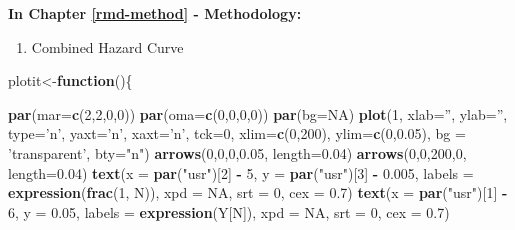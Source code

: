 \documentclass[12pt,oneside]{reedthesis}
\newenvironment{Shaded}{\begin{snugshade}}{\end{snugshade}}
\newcommand{\ControlFlowTok}[1]{\textcolor[rgb]{0.13,0.29,0.53}{\textbf{#1}}}
\newcommand{\DataTypeTok}[1]{\textcolor[rgb]{0.13,0.29,0.53}{#1}}
\newcommand{\DecValTok}[1]{\textcolor[rgb]{0.00,0.00,0.81}{#1}}
\newcommand{\FloatTok}[1]{\textcolor[rgb]{0.00,0.00,0.81}{#1}}
\newcommand{\KeywordTok}[1]{\textcolor[rgb]{0.13,0.29,0.53}{\textbf{#1}}}
\newcommand{\NormalTok}[1]{#1}
\newcommand{\OperatorTok}[1]{\textcolor[rgb]{0.81,0.36,0.00}{\textbf{#1}}}
\newcommand{\OtherTok}[1]{\textcolor[rgb]{0.56,0.35,0.01}{#1}}
\newcommand{\StringTok}[1]{\textcolor[rgb]{0.31,0.60,0.02}{#1}}
\providecommand{\tightlist}{%
  \setlength{\itemsep}{0pt}\setlength{\parskip}{0pt}}
\begin{document}
\textbf{In Chapter \ref{rmd-method} - Methodology:}
\begin{enumerate}
\def\labelenumi{\arabic{enumi}.}
\tightlist
\item
  Combined Hazard Curve
\end{enumerate}
\tiny
\begin{Shaded}
\begin{Highlighting}[]
\NormalTok{plotit<-}\ControlFlowTok{function}\NormalTok{()\{}

  \KeywordTok{par}\NormalTok{(}\DataTypeTok{mar=}\KeywordTok{c}\NormalTok{(}\DecValTok{2}\NormalTok{,}\DecValTok{2}\NormalTok{,}\DecValTok{0}\NormalTok{,}\DecValTok{0}\NormalTok{))}
  \KeywordTok{par}\NormalTok{(}\DataTypeTok{oma=}\KeywordTok{c}\NormalTok{(}\DecValTok{0}\NormalTok{,}\DecValTok{0}\NormalTok{,}\DecValTok{0}\NormalTok{,}\DecValTok{0}\NormalTok{))}
  \KeywordTok{par}\NormalTok{(}\DataTypeTok{bg=}\OtherTok{NA}\NormalTok{)}
  \KeywordTok{plot}\NormalTok{(}\DecValTok{1}\NormalTok{, }\DataTypeTok{xlab=}\StringTok{''}\NormalTok{, }\DataTypeTok{ylab=}\StringTok{''}\NormalTok{, }\DataTypeTok{type=}\StringTok{'n'}\NormalTok{, }\DataTypeTok{yaxt=}\StringTok{'n'}\NormalTok{, }\DataTypeTok{xaxt=}\StringTok{'n'}\NormalTok{, }\DataTypeTok{tck=}\DecValTok{0}\NormalTok{, }\DataTypeTok{xlim=}\KeywordTok{c}\NormalTok{(}\DecValTok{0}\NormalTok{,}\DecValTok{200}\NormalTok{), }\DataTypeTok{ylim=}\KeywordTok{c}\NormalTok{(}\DecValTok{0}\NormalTok{,}\FloatTok{0.05}\NormalTok{), }\DataTypeTok{bg =} \StringTok{'transparent'}\NormalTok{, }\DataTypeTok{bty=}\StringTok{"n"}\NormalTok{)}
  \KeywordTok{arrows}\NormalTok{(}\DecValTok{0}\NormalTok{,}\DecValTok{0}\NormalTok{,}\DecValTok{0}\NormalTok{,}\FloatTok{0.05}\NormalTok{, }\DataTypeTok{length=}\FloatTok{0.04}\NormalTok{)}
  \KeywordTok{arrows}\NormalTok{(}\DecValTok{0}\NormalTok{,}\DecValTok{0}\NormalTok{,}\DecValTok{200}\NormalTok{,}\DecValTok{0}\NormalTok{, }\DataTypeTok{length=}\FloatTok{0.04}\NormalTok{)}
  \KeywordTok{text}\NormalTok{(}\DataTypeTok{x =} \KeywordTok{par}\NormalTok{(}\StringTok{"usr"}\NormalTok{)[}\DecValTok{2}\NormalTok{] }\OperatorTok{-}\StringTok{ }\DecValTok{5}\NormalTok{,  }\DataTypeTok{y =} \KeywordTok{par}\NormalTok{(}\StringTok{"usr"}\NormalTok{)[}\DecValTok{3}\NormalTok{] }\OperatorTok{-}\StringTok{ }\FloatTok{0.005}\NormalTok{, }\DataTypeTok{labels =} \KeywordTok{expression}\NormalTok{(}\KeywordTok{frac}\NormalTok{(}\DecValTok{1}\NormalTok{, N)), }\DataTypeTok{xpd =} \OtherTok{NA}\NormalTok{, }\DataTypeTok{srt =} \DecValTok{0}\NormalTok{, }\DataTypeTok{cex =} \FloatTok{0.7}\NormalTok{)}
  \KeywordTok{text}\NormalTok{(}\DataTypeTok{x =} \KeywordTok{par}\NormalTok{(}\StringTok{"usr"}\NormalTok{)[}\DecValTok{1}\NormalTok{] }\OperatorTok{-}\StringTok{ }\DecValTok{6}\NormalTok{,  }\DataTypeTok{y =} \FloatTok{0.05}\NormalTok{, }\DataTypeTok{labels =} \KeywordTok{expression}\NormalTok{(Y[N]), }\DataTypeTok{xpd =} \OtherTok{NA}\NormalTok{, }\DataTypeTok{srt =} \DecValTok{0}\NormalTok{, }\DataTypeTok{cex =} \FloatTok{0.7}\NormalTok{)}

\end{Highlighting}
\end{Shaded}
\end{document}
